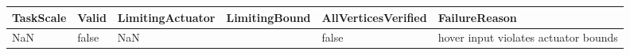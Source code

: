 \begin{tabular}{@{}llllll@{}}
\toprule
TaskScale & Valid & LimitingActuator & LimitingBound & AllVerticesVerified & FailureReason \\
\midrule
NaN & false & NaN &  & false & hover input violates actuator bounds \\
\bottomrule
\end{tabular}
